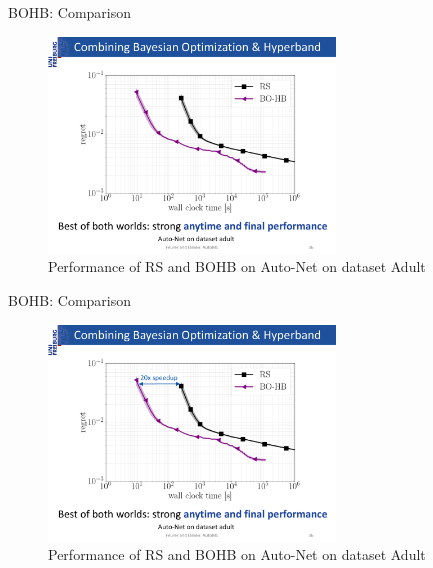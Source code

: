 \begin{frame}{BOHB: Comparison}
\begin{figure}
    \centering
    \includegraphics[width=0.68\textwidth]{../w07_hpo_speedup/images/bohb/BOHB_1.pdf}
    \caption{Performance of RS and BOHB on Auto-Net on dataset Adult}
\end{figure}

\end{frame}
\begin{frame}{BOHB: Comparison}
\begin{figure}
    \centering
    \includegraphics[width=0.68\textwidth]{../w07_hpo_speedup/images/bohb/BOHB_2.pdf}
    \caption{Performance of RS and BOHB on Auto-Net on dataset Adult}
\end{figure}

\end{frame}
